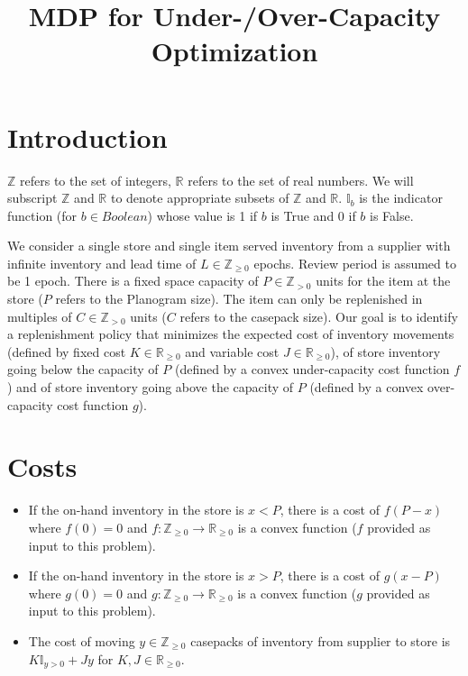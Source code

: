 \documentclass[12pt]{amsart}
\title{MDP for Under-/Over-Capacity Optimization}
\author{}
\date{} %
\begin{document}
\maketitle

\section{Introduction}

$\mathbb{Z}$ refers to the set of integers, $\mathbb{R}$ refers to the set of real numbers. We will subscript $\mathbb{Z}$ and $\mathbb{R}$ to denote appropriate subsets of $\mathbb{Z}$ and $\mathbb{R}$. $\mathbb{I}_{b}$ is the indicator function (for $b \in Boolean$) whose value is 1 if $b$ is True and 0 if $b$ is False.
 
We consider a single store and single item served inventory from a supplier with infinite inventory and lead time of $L \in \mathbb{Z}_{\geq 0}$ epochs. Review period is assumed to be 1 epoch. There is a fixed space capacity of $P \in \mathbb{Z}_{> 0}$ units for the item at the store ($P$ refers to the Planogram size). The item can only be replenished in multiples of $C \in \mathbb{Z}_{> 0}$ units ($C$ refers to the casepack size). Our goal is to identify a replenishment policy that minimizes the expected cost of inventory movements (defined by fixed cost $K \in \mathbb{R}_{\geq 0}$ and variable cost $J \in \mathbb{R}_{\geq 0}$), of store inventory going below the capacity of $P$ (defined by a convex under-capacity cost function $f$) and of store inventory going above the capacity of $P$ (defined by a convex over-capacity cost function $g$).

\section{Costs}
\begin{itemize}
\item If the on-hand inventory in the store is $x < P$, there is a cost of $f(P-x)$ where $f(0) = 0$ and $f : \mathbb{Z}_{\geq 0} \rightarrow \mathbb{R}_{\geq 0}$ is a convex function ($f$ provided as input to this problem).
\item If the on-hand inventory in the store is $x > P$, there is a cost of $g(x-P)$ where $g(0) = 0$ and $g : \mathbb{Z}_{\geq 0} \rightarrow \mathbb{R}_{\geq 0}$ is a convex function ($g$ provided as input to this problem).
\item The cost of moving $y \in \mathbb{Z}_{\geq 0}$ casepacks of inventory from supplier to store is $K \mathbb{I}_{y > 0} + J y$ for $K, J \in \mathbb{R}_{\geq 0}$.
\end{itemize}
\end{document}
